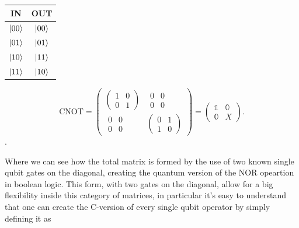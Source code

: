 \begin{minipage}{0.45\textwidth}
    \centering
    \begin{tabular}{c|c}
        \textbf{IN} & \textbf{OUT}\\
        \midrule
        $\ket{00}$ & $\ket{00}$\\
        $\ket{01}$ & $\ket{01}$\\
        $\ket{10}$ & $\ket{11}$\\
        $\ket{11}$ & $\ket{10}$
    \end{tabular}
\end{minipage}
\begin{minipage}{0.45\textwidth}
    \centering
    \begin{displaymath}
        \text{CNOT} = \begin{pmatrix}
            \begin{pmatrix}
                1 & 0\\
                0 & 1
            \end{pmatrix} &  \begin{matrix}
                0 & 0\\
                0 & 0
            \end{matrix}\\
            \begin{matrix}
                0 & 0\\
                0 & 0
            \end{matrix} & \begin{pmatrix}
                0 & 1\\
                1 & 0
            \end{pmatrix}
        \end{pmatrix} = \begin{pmatrix}
            \mathbb{1} & \mathbb{0}\\
            \mathbb{0} & X
        \end{pmatrix}.
    \end{displaymath}.
\end{minipage}

\noindent
Where we can see how the total matrix is formed by the use of two known single qubit gates on the diagonal, creating the quantum version of the NOR opeartion in boolean logic. This form, with two gates on the diagonal, allow for a big flexibility inside this category of matrices, in particular it's easy to understand that one can create the C-version of every single qubit operator by simply defining it as

